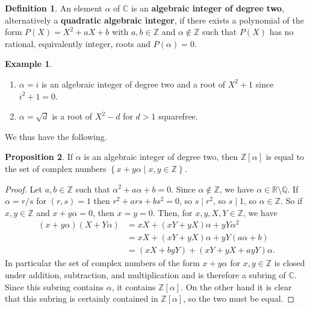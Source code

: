 \documentclass{article}
\newcommand{\Z}{\mathbb{Z}}
\newcommand{\Q}{\mathbb{Q}}
\newcommand{\R}{\mathbb{R}}
\newcommand{\C}{\mathbb{C}}
\newcommand{\rb}[1]{\left( #1 \right)}
\renewcommand{\sb}[1]{\left[ #1 \right]}
\newcommand{\cb}[1]{\left\{ #1 \right\}}
\theoremstyle{definition}\newtheorem{definition}{Definition}
\theoremstyle{definition}\newtheorem{remark}[definition]{Remark}
\theoremstyle{definition}\newtheorem*{example}{Example}
\theoremstyle{definition}\newtheorem*{note}{Note}
\newtheorem{proposition}[definition]{Proposition}
\begin{document}
\begin{definition}
An element $ \alpha $ of $ \C $ is an \textbf{algebraic integer of degree two}, alternatively a \textbf{quadratic algebraic integer}, if there exists a polynomial of the form $ P\rb{X} = X^2 + aX + b $ with $ a, b \in \Z $ and $ \alpha \notin \Z $ such that $ P\rb{X} $ has no rational, equivalently integer, roots and $ P\rb{\alpha} = 0 $.
\end{definition}

\begin{example}
\hfill
\begin{enumerate}
\item $ \alpha = i $ is an algebraic integer of degree two and a root of $ X^2 + 1 $ since $ i^2 + 1 = 0 $.
\item $ \alpha = \sqrt{d} $ is a root of $ X^2 - d $ for $ d > 1 $ squarefree.
\end{enumerate}
\end{example}

We thus have the following.

\begin{proposition}
If $ \alpha $ is an algebraic integer of degree two, then $ \Z\sb{\alpha} $ is equal to the set of complex numbers $ \cb{x + y\alpha \mid x, y \in \Z} $.
\end{proposition}

\begin{proof}
Let $ a, b \in \Z $ such that $ \alpha^2 + a\alpha + b = 0 $. Since $ \alpha \notin \Z $, we have $ \alpha \in \R \setminus \Q $. If $ \alpha = r / s $ for $ \rb{r, s} = 1 $ then $ r^2 + ars + bs^2 = 0 $, so $ s \mid r^2 $, so $ s \mid 1 $, so $ \alpha \in \Z $. So if $ x, y \in \Z $ and $ x + y\alpha = 0 $, then $ x = y = 0 $. Then, for $ x, y, X, Y \in \Z $, we have
\begin{align*}
\rb{x + y\alpha}\rb{X + Y\alpha}
& = xX + \rb{xY + yX}\alpha + yY\alpha^2 \\
& = xX + \rb{xY + yX}\alpha + yY\rb{a\alpha + b} \\
& = \rb{xX + byY} + \rb{xY + yX + ayY}\alpha.
\end{align*}
In particular the set of complex numbers of the form $ x + y\alpha $ for $ x, y \in \Z $ is closed under addition, subtraction, and multiplication and is therefore a subring of $ \C $. Since this subring contains $ \alpha $, it contains $ \Z\sb{\alpha} $. On the other hand it is clear that this subring is certainly contained in $ \Z\sb{\alpha} $, so the two must be equal.
\end{proof}
\end{document}
